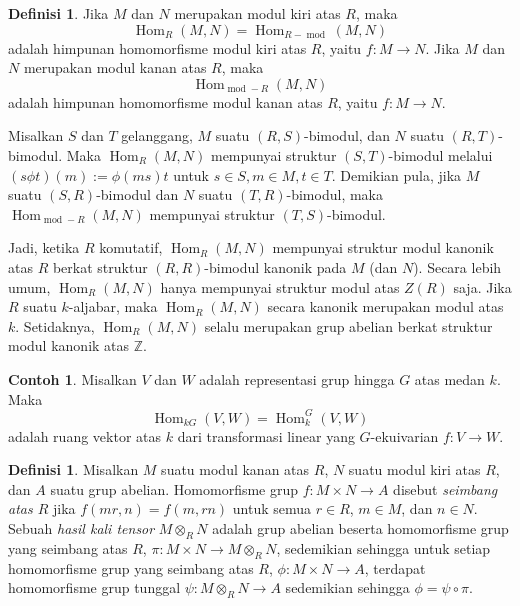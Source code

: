 \documentclass[12pt]{article}
\theoremstyle{plain}
\theoremstyle{definition}
\newtheorem{definition}[theorem]{Definisi}
\newtheorem{example}[theorem]{Contoh}
\theoremstyle{remark}
\numberwithin{equation}{section}
\begin{document}
\begin{definition}
Jika $M$ dan $N$ merupakan modul kiri atas $R$, maka
\[
\operatorname{Hom}_R(M,N) = \operatorname{Hom}_{R-\operatorname{mod}}(M,N)
\]
adalah himpunan homomorfisme modul kiri atas $R$, yaitu $f : M \to N$.
Jika $M$ dan $N$ merupakan modul kanan atas $R$, maka
\[
\operatorname{Hom}_{\operatorname{mod}-R}(M,N)
\]
adalah himpunan homomorfisme modul kanan atas $R$, yaitu $f : M \to N$.
\end{definition}

Misalkan $S$ dan $T$ gelanggang,
$M$ suatu $(R,S)$-bimodul, dan $N$ suatu $(R,T)$-bimodul.
Maka $\operatorname{Hom}_R(M,N)$ mempunyai struktur $(S,T)$-bimodul
melalui $(s\phi t)(m):=\phi(ms)t$ untuk $s \in S, m \in M, t\in T$.
Demikian pula, jika $M$ suatu $(S,R)$-bimodul dan $N$ suatu $(T,R)$-bimodul,
maka $\operatorname{Hom}_{\operatorname{mod}-R}(M,N)$
mempunyai struktur $(T,S)$-bimodul.

Jadi, ketika $R$ komutatif, $\operatorname{Hom}_R(M,N)$
mempunyai struktur modul kanonik atas $R$ berkat struktur
$(R,R)$-bimodul kanonik pada $M$ (dan $N$).
Secara lebih umum, $\operatorname{Hom}_R(M,N)$ hanya mempunyai struktur modul atas $Z(R)$
saja.
Jika $R$ suatu $k$-aljabar, maka $\operatorname{Hom}_R(M,N)$
secara kanonik merupakan modul atas $k$.
Setidaknya, $\operatorname{Hom}_R(M,N)$ selalu merupakan
grup abelian berkat struktur modul kanonik atas $\mathbb{Z}$.

\begin{example}
Misalkan $V$ dan $W$ adalah representasi grup hingga $G$
atas medan $k$.
Maka
\[
\operatorname{Hom}_{kG}(V,W) = \operatorname{Hom}^G_k(V,W)
\]
adalah ruang vektor atas $k$ dari transformasi linear yang $G$-ekuivarian
$f : V \to W$.
\end{example}

\begin{definition}
Misalkan $M$ suatu modul kanan atas $R$, $N$ suatu modul kiri atas $R$,
dan $A$ suatu grup abelian.
Homomorfisme grup $f: M \times N \to A$ disebut \emph{seimbang atas $R$}
jika $f(mr,n)=f(m,rn)$ untuk semua $r \in R$, $m \in M$, dan $n \in N$.
Sebuah \emph{hasil kali tensor} $M \otimes_R N$ adalah grup abelian
beserta homomorfisme grup yang seimbang atas $R$,
$\pi : M \times N \to M \otimes_R N$, sedemikian sehingga
untuk setiap homomorfisme grup yang seimbang atas $R$,
$\phi : M \times N \to A$, terdapat homomorfisme grup tunggal
$\psi :  M \otimes_R N \to A$
sedemikian sehingga $\phi = \psi \circ \pi$.
\end{definition}
\end{document}
